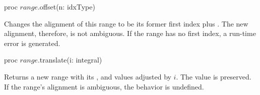 \begin{protohead}
proc $range$.offset(n: idxType)
\end{protohead}
\label{Range_Offset_Method}
\begin{protobody}
Changes the alignment of this range to be its former first index plus
. The new alignment, therefore, is not ambiguous.
If the range has no first index, a run-time error is generated.
\end{protobody}

\begin{protohead}
proc $range$.translate(i: integral)
\end{protohead}
\begin{protobody}
Returns a new range with its ,  and  values
adjusted by $i$.  The  value is preserved.
If the range's alignment is ambiguous, the behavior is undefined.
\end{protobody}

\begin{protohead}
\end{protohead}
\begin{protobody}
\end{protobody}
